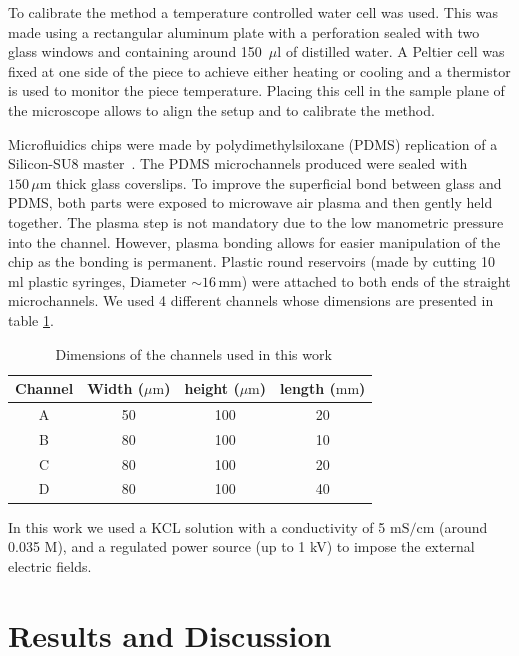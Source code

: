 \documentclass[9pt,twocolumn,twoside]{osajnl}
\begin{document}
To calibrate the method a temperature controlled water cell was used. This was made using a rectangular aluminum plate with a perforation sealed with two glass windows and containing around 150~$\mu\mathrm{l}$ of distilled water. A Peltier cell was fixed at one side of the piece to achieve either heating or cooling and a thermistor is used to monitor the piece temperature.  Placing this cell in the sample plane of the microscope allows to align the setup and to calibrate the method. 

Microfluidics chips were made by polydimethylsiloxane (PDMS) replication of a Silicon-SU8 master~\cite{duffy1998rapid}. The PDMS microchannels produced were sealed with $150\,\mu\mathrm{m}$ thick glass coverslips. To improve the superficial bond between glass and PDMS, both parts were exposed to microwave air plasma and then gently held together. The plasma step is not mandatory due to the low manometric pressure into the channel. However, plasma bonding allows for easier manipulation of the chip as the bonding is permanent. Plastic round reservoirs (made by cutting 10 ml plastic syringes, Diameter $\sim 16\,\mathrm{mm}$) were attached to both ends of the straight microchannels. We used 4 different channels whose dimensions are presented in table \ref{channeldims}.
\begin{table}[ht]
\small
  \caption{\ Dimensions of the channels used in this work}
  \begin{tabular*}{0.5\textwidth}{@{\extracolsep{\fill}}cccc}
    \hline
    Channel & Width ($\mu\mathrm{m}$) & height ($\mu\mathrm{m}$) & length ($\mathrm{mm}$) \\
    \hline
    A & 50 & 100 & 20\\
    B & 80 & 100 & 10\\
    C & 80 & 100 & 20\\
    D & 80 & 100 & 40\\
    \hline
  \end{tabular*}
  \label{channeldims}
\end{table} 
 
In this work we used a KCL solution with a conductivity of 5 $\mathrm{mS/cm}$ (around 0.035 M), and a regulated power source (up to 1 kV) to impose the external electric fields.



\section{Results and Discussion}
\end{document}

